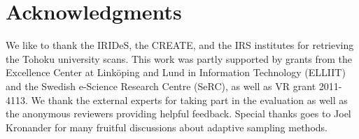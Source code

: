 \documentclass{egpubl}
\begin{document}
\section*{Acknowledgments}
We like to thank the IRIDeS, the CREATE, and the IRS institutes for retrieving the Tohoku university scans. This work was partly supported by grants from the Excellence Center at Link\"oping and Lund in Information Technology (ELLIIT) and the Swedish e-Science Research Centre (SeRC), as well as VR grant 2011-4113. We thank the external experts for taking part in the evaluation as well as the anonymous reviewers providing helpful feedback. Special thanks goes to Joel Kronander for many fruitful discussions about adaptive sampling methods.

%


\end{document}
